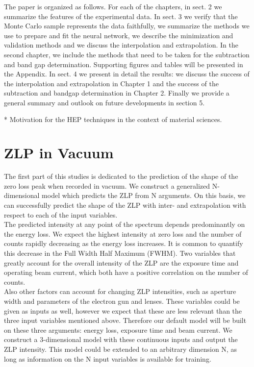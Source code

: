 \documentclass[11pt,a4paper]{article}
\numberwithin{equation}{section}
\numberwithin{figure}{section}
\numberwithin{table}{section}
\begin{document}
The paper is organized as follows. For each of the chapters, in sect. 2 we summarize the features of the experimental data. In sect. 3 we verify that the Monte Carlo sample represents the data faithfully, we summarize the methods we use to prepare and fit the neural network, we describe the minimization and validation methods and we discuss the interpolation and extrapolation. In the second chapter, we include the methods that need to be taken for the subtraction and band gap determination. Supporting figures and tables will be presented in the Appendix.
In sect. 4 we present in detail the results: we discuss the success of the interpolation and extrapolation in Chapter 1 and the success of the subtraction and bandgap determination in Chapter 2. Finally we provide a general summary and outlook on future developments in section 5. 



* Motivation for the HEP techniques in the context of material sciences.

\part{ZLP in Vacuum}

The first part of this studies is dedicated to the prediction of the shape of the zero loss peak when recorded in vacuum. We construct a generalized N-dimensional model which predicts the ZLP from N arguments. On this basis, we can successfully predict the shape of the ZLP with inter- and extrapolation with respect to each of the input variables. \\

The predicted intensity at any point of the spectrum depends predominantly on the energy loss. We expect the highest intensity at zero loss and the number of counts rapidly decreasing as the energy loss increases. It is common to quantify this decrease in the Full Width Half Maximum (FWHM). Two variables that greatly account for the overall intensity of the ZLP are the exposure time and operating beam current, which both have a positive correlation on the number of counts. \\
Also other factors can account for changing ZLP intensities, such as aperture width and parameters of the electron gun and lenses. These variables could be given as inputs as well, however we expect that these are less relevant than the three input variables mentioned above. Therefore our default model will be built on these three arguments: energy loss, exposure time and beam current. We construct a 3-dimensional model with these continuous inputs and output the ZLP intensity. This model could be extended to an arbitrary dimension N, as long as information on the N input variables is available for training.
\end{document}
